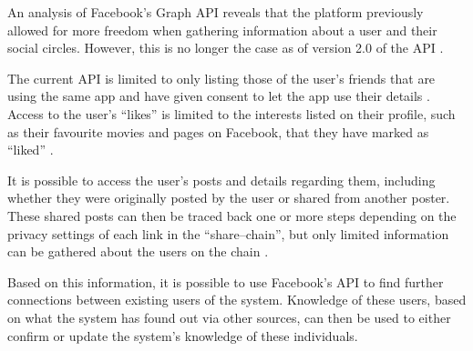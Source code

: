 An analysis of Facebook's Graph \ac{API} \citep{FacebookGraphApiDocumentation}
reveals that the platform previously allowed for more freedom when gathering
information about a user and their social circles. However, this is no longer
the case as of version 2.0 of the \ac{API}
\citep{FacebookChangesInGraphTwoPointOh}.

The current \ac{API} is limited to only listing those of the user's friends
that are using the same app and have given consent to let the app use their
details \citep{FacebookChangesInGraphTwoPointOh}. Access to the user's ``likes''
is limited to the interests listed on their profile, such as their favourite
movies and pages on Facebook, that they have marked as ``liked''
\citep{FacebookGraphApiUserLikes} \citep{FacebookGraphApiUserEdges}.\nl

It is possible to access the user's posts and details regarding them,
including whether they were originally posted by the user or shared from
another poster. These shared posts can then be traced back one or more steps
depending on the privacy settings of each link in the ``share--chain'', but
only limited information can be gathered about the users on the chain
\citep{FacebookGraphApiUserFeed}.\nl

Based on this information, it is possible to use Facebook's \ac{API} to find
further connections between existing users of the system.
Knowledge of these users, based on what the system has found out via other
sources, can then be used to either confirm or update the system's knowledge of
these individuals.